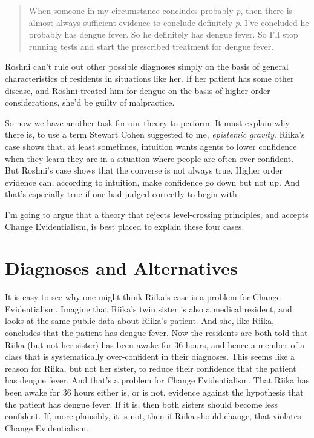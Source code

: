 \begin{quote}
When someone in my circumstance concludes probably \emph{p}, then there is almost always sufficient evidence to conclude definitely \emph{p}. I've concluded he probably has dengue fever. So he definitely has dengue fever. So I'll stop running tests and start the prescribed treatment for dengue fever.
\end{quote}
\gls{Roshni} can't rule out other possible diagnoses simply on the basis of general characteristics of residents in situations like her. If her patient has some other disease, and \gls{Roshni} treated him for dengue on the basis of higher-order considerations, she'd be guilty of malpractice.

So now we have another task for our theory to perform. It must explain why there is, to use a term Stewart Cohen suggested to me, \emph{epistemic gravity}. \gls{Riika}'s case shows that, at least sometimes, intuition wants agents to lower confidence when they learn they are in a situation where people are often over-confident. But \gls{Roshni}'s case shows that the converse is not always true. Higher order evidence can, according to intuition, make confidence go down but not up. And that's especially true if one had judged correctly to begin with.

I'm going to argue that a theory that rejects level-crossing principles, and accepts Change Evidentialism, is best placed to explain these four cases.

\section{Diagnoses and Alternatives}
\label{diagnosesandalternatives}

It is easy to see why one might think \gls{Riika}'s case is a problem for Change Evidentialism. Imagine that \gls{Riika}'s twin sister is also a medical resident, and looks at the same public data about \gls{Riika}'s patient. And she, like \gls{Riika}, concludes that the patient has dengue fever. Now the residents are both told that \gls{Riika} (but not her sister) has been awake for 36 hours, and hence a member of a class that is systematically over-confident in their diagnoses. This seems like a reason for \gls{Riika}, but not her sister, to reduce their confidence that the patient has dengue fever. And that's a problem for Change Evidentialism. That \gls{Riika} has been awake for 36 hours either is, or is not, evidence against the hypothesis that the patient has dengue fever. If it is, then both sisters should become less confident. If, more plausibly, it is not, then if \gls{Riika} should change, that violates Change Evidentialism.

